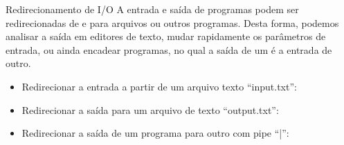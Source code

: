 \documentclass{beamer}
\begin{document}
\begin{frame}{Redirecionamento de I/O}
  A entrada e saída de programas podem ser redirecionadas de e para arquivos ou
  outros programas. Desta forma, podemos analisar a saída em editores de texto,
  mudar rapidamente os parâmetros de entrada, ou ainda encadear programas, no
  qual a saída de um é a entrada de outro.
  \begin{center}
    \begin{itemize}
    \item Redirecionar a entrada a partir de um arquivo texto ``input.txt'':
    \end{itemize}
    \begin{shell}
    \end{shell}

    \begin{itemize}
    \item Redirecionar a saída para um arquivo de texto ``output.txt'':
    \end{itemize}
    \begin{shell}
    \end{shell}

    \begin{itemize}
    \item Redirecionar a saída de um programa para outro com pipe ``|'':
    \end{itemize}
    \begin{shell}
    \end{shell}
    
  \end{center}

\end{frame}
\end{document}
